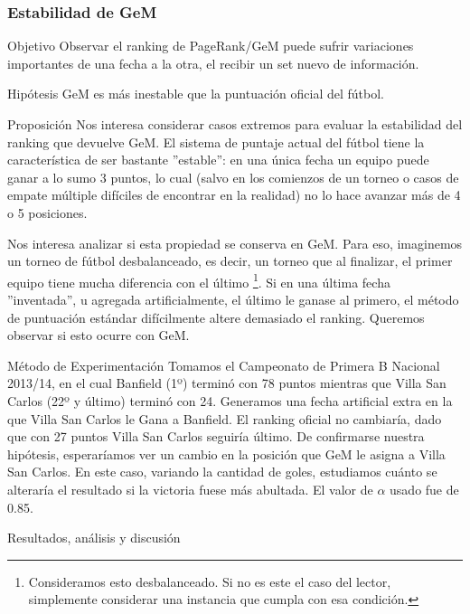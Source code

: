 \subsubsection{Estabilidad de GeM}
\label{subsec:exp7}
\begin{LaTeXdescription}
    \item[Objetivo] Observar el ranking de PageRank/GeM puede sufrir variaciones
        importantes de una fecha a la otra, el recibir un set nuevo de
        informaci\'on.\\

    \item[Hip\'otesis] GeM es m\'as inestable que la puntuaci\'on oficial del
        f\'utbol.\\

    \item[Proposici\'on] Nos interesa considerar casos extremos para evaluar la
        estabilidad del ranking que devuelve GeM. El sistema de puntaje actual
        del f\'utbol tiene la caracter\'istica de ser bastante ''estable'': en
        una \'unica fecha un equipo puede ganar a lo sumo 3 puntos, lo cual
        (salvo en los comienzos de un torneo o casos de empate m\'ultiple
        dif\'iciles de encontrar en la realidad) no lo hace avanzar m\'as de 4 o
        5 posiciones.

        \par Nos interesa analizar si esta propiedad se conserva en GeM. Para
        eso, imaginemos un torneo de f\'utbol desbalanceado, es decir, un torneo
        que al finalizar, el primer equipo tiene mucha diferencia con el
        \'ultimo \footnote{Consideramos esto desbalanceado. Si no es este el
        caso del lector, simplemente considerar una instancia que cumpla con esa
        condici\'on.}. Si en una \'ultima fecha ''inventada'', u agregada
        artificialmente, el \'ultimo le ganase al primero, el m\'etodo de
        puntuaci\'on est\'andar dif\'icilmente altere demasiado el ranking.
        Queremos observar si esto ocurre con GeM.\\

    \item[M\'etodo de Experimentaci\'on] Tomamos el Campeonato de Primera B
        Nacional 2013/14, en el cual Banfield (1º) termin\'o con 78 puntos
        mientras que Villa San Carlos (22º y \'ultimo) termin\'o con 24.
        Generamos una fecha artificial extra en la que Villa San Carlos le Gana
        a Banfield. El ranking oficial no cambiar\'ia, dado que con 27
        puntos Villa San Carlos seguir\'ia \'ultimo. De confirmarse nuestra
        hip\'otesis, esperar\'iamos ver un cambio en la posición que GeM le
        asigna a Villa San Carlos. En este caso, variando la cantidad de goles,
        estudiamos cu\'anto se alterar\'ia el resultado si la victoria fuese
        m\'as abultada. El valor de $\alpha$ usado fue de 0.85.\\

    \item[Resultados, an\'alisis y discusi\'on]
\end{LaTeXdescription}

